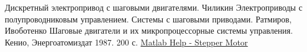 \newpage

\begin{thebibliography}{20}
 Дискретный электропривод с шаговыми двигателями. Чиликин
 Электроприводы с полупроводниковым управлением. Системы с шаговыми приводами. Ратмиров, Ивоботенко
 Шаговые двигатели и их микропроцессорные системы управления. Кенио, Энергоатомиздат 1987. 200 с.
 \href{http://www.mathworks.com/help/physmod/sps/powersys/ref/steppermotor.html}{Matlab Help - Stepper Motor}
\end{thebibliography}
